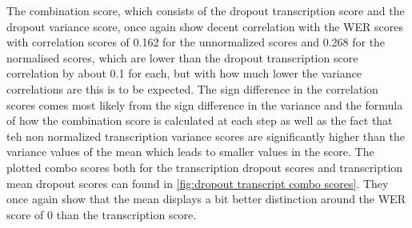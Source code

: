 The combination score, which consists of the dropout transcription score and the dropout variance score, once again show decent correlation with the WER scores with correlation scores of 0.162 for the unnormalized scores and 0.268 for the normalised scores, which are lower than the dropout transcription score correlation by about 0.1 for each, but with how much lower the variance correlations are this is to be expected. The sign difference in the correlation scores comes most likely from the sign difference in the variance and the formula of how the combination score is calculated at each step as well as the fact that teh non normalized transcription variance scores are significantly higher than the variance values of the mean which leads to smaller values in the score. 
The plotted combo scores both for the transcription dropout scores and transcription mean dropout scores can found in \autoref{fig:dropout transcript combo scores}. They once again show that the mean displays a bit better distinction around the WER score of 0 than the transcription score. 

